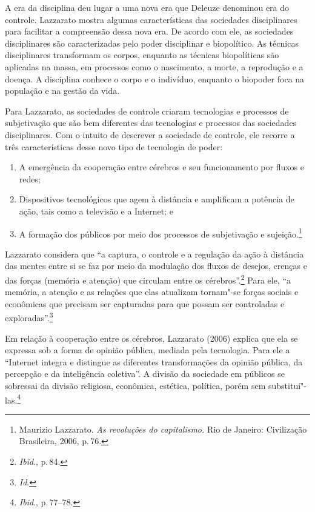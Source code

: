A era da disciplina deu lugar a uma nova era que Deleuze denominou era
do controle. Lazzarato mostra algumas características das
sociedades disciplinares para facilitar a compreensão dessa nova era. De
acordo com ele, as sociedades disciplinares são caracterizadas pelo
poder disciplinar e biopolítico. As técnicas disciplinares transformam
os corpos, enquanto as técnicas biopolíticas são aplicadas na massa, em
processos como o nascimento, a morte, a reprodução e a doença. A
disciplina conhece o corpo e o indivíduo, enquanto o biopoder foca na
população e na gestão da vida.

Para Lazzarato, as sociedades de controle criaram tecnologias e
processos de subjetivação que são bem diferentes das tecnologias e
processos das sociedades disciplinares. Com o intuito de descrever a
sociedade de controle, ele recorre a três características desse novo
tipo de tecnologia de poder: 

\begin{enumerate}
\item A emergência da cooperação entre
cérebros e seu funcionamento por fluxos e redes;

\item Dispositivos
tecnológicos que agem à distância e amplificam a potência de ação, tais
como a televisão e a Internet; e 

\item A formação dos públicos por meio dos
processos de subjetivação e sujeição.\footnote{Maurizio Lazzarato. \textit{As revoluções do capitalismo.} Rio de Janeiro: Civilização Brasileira, 2006, p.\,76.}
\end{enumerate}

Lazzarato considera que ``a captura, o controle e a regulação da
ação à distância das mentes entre si se faz por meio da modulação dos
fluxos de desejos, crenças e das forças (memória e atenção) que circulam
entre os cérebros''.\footnote{\textit{Ibid}., p.\,84.} Para ele, ``a memória, a atenção e as
relações que elas atualizam tornam"-se forças sociais e econômicas que
precisam ser capturadas para que possam ser controladas e exploradas''.\footnote{\textit{Id}.}

Em relação à cooperação entre os cérebros, Lazzarato (2006) explica que
ela se expressa sob a forma de opinião pública, mediada pela tecnologia.
Para ele a ``Internet integra e distingue as diferentes transformações
da opinião pública, da percepção e da inteligência coletiva''. A divisão
da sociedade em públicos se sobressai da divisão religiosa, econômica,
estética, política, porém sem substituí"-las.\footnote{\textit{Ibid}., p.\,77--78.}

